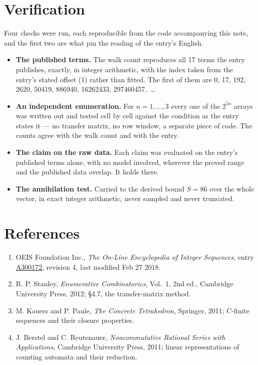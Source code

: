 \documentclass[11pt]{article}
\theoremstyle{definition}
\begin{document}
\section{Verification}

Four checks were run, each reproducible from the code accompanying this note, and the first two are what pin the reading of the entry's English.

\begin{itemize}

\item {\bfseries The published terms.} The walk count reproduces all 17 terms the entry publishes, exactly, in integer arithmetic, with the index taken from the entry's stated offset (1) rather than fitted. The first of them are 0, 17, 192, 2620, 50419, 886940, 16262433, 297460457,~\dots

\item {\bfseries An independent enumeration.} For $n = 1,\dots,3$ every one of the $2^{5n}$ arrays was written out and tested cell by cell against the condition as the entry states it --- no transfer matrix, no row window, a separate piece of code. The counts agree with the walk count and with the entry.

\item {\bfseries The claim on the raw data.} Each claim was evaluated on the entry's published terms alone, with no model involved, wherever the proved range and the published data overlap. It holds there.

\item {\bfseries The annihilation test.} Carried to the derived bound $S = 86$ over the whole vector, in exact integer arithmetic, never sampled and never truncated.

\end{itemize}

\section{References}

\begin{enumerate}

\item OEIS Foundation Inc., \emph{The On-Line Encyclopedia of Integer Sequences}, entry \href{https://oeis.org/A300172}{A300172}, revision 4, last modified Feb 27 2018.

\item R. P. Stanley, \emph{Enumerative Combinatorics}, Vol.~1, 2nd ed., Cambridge University Press, 2012; \S4.7, the transfer-matrix method.

\item M. Kauers and P. Paule, \emph{The Concrete Tetrahedron}, Springer, 2011; C-finite sequences and their closure properties.

\item J. Berstel and C. Reutenauer, \emph{Noncommutative Rational Series with Applications}, Cambridge University Press, 2011; linear representations of counting automata and their reduction.

\end{enumerate}
\end{document}

